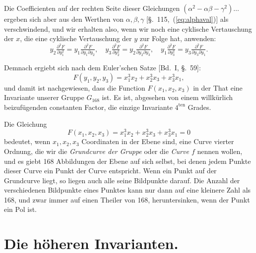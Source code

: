 \documentclass[12pt,a4paper]{article}
\begin{document}
Die Coefficienten auf der rechten Seite dieser Gleichungen $(\alpha^2 - \alpha\beta - \gamma^2) \ldots$ ergeben sich aber aus den Werthen von $\alpha, \beta, \gamma$ [\S.~115,~(\ref{eq:alphaval})] als verschwindend, und wir erhalten also, wenn wir noch eine cyklische Vertauschung der $x$, die eine cyklische Vertauschung der $y$ zur Folge hat, anwenden:
\[y_2 \tfrac{\partial^2 F}{\partial y_1^2} = y_1 \tfrac{\partial^2 F}{\partial y_1 \partial y_2}, \quad y_3 \tfrac{\partial^2 F}{\partial y_2^2} = y_2 \tfrac{\partial^2 F}{\partial y_2 \partial y_3}, \quad y_1 \tfrac{\partial^2 F}{\partial y_3^2} = y_3 \tfrac{\partial^2 F}{\partial y_3 \partial y_1}.\]

Demnach ergiebt sich nach dem Euler'schen Satze [Bd.~I, \S.~59]:
\[F(y_1, y_2, y_3) = x_1^3 x_2 + x_2^3 x_3 + x_3^3 x_1,\]
und damit ist nachgewiesen, dass die Function $F(x_1, x_2, x_3)$ in der That eine Invariante unserer Gruppe $G_{168}$ ist. Es ist, abgesehen von einem willk\"urlich beizuf\"ugenden constanten Factor, die einzige Invariante $4^{\text{ten}}$ Grades.

Die Gleichung
\begin{equation}
\label{eq:grundcurve} F(x_1, x_2, x_3) = x_1^3 x_2 + x_2^3 x_3 + x_3^3 x_1 = 0
\end{equation}
bedeutet, wenn $x_1, x_2, x_3$ Coordinaten in der Ebene sind, eine Curve vierter Ordnung, die wir die \textit{Grundcurve der Gruppe} oder die \textit{Curve $f$} nennen wollen, und es giebt 168 Abbildungen der Ebene auf sich selbst, bei denen jedem Punkte dieser Curve ein Punkt der Curve entspricht. Wenn ein Punkt auf der Grundcurve liegt, so liegen auch alle seine Bildpunkte darauf. Die Anzahl der verschiedenen Bildpunkte eines Punktes kann nur dann auf eine kleinere Zahl als 168, und zwar immer auf einen Theiler von 168, heruntersinken, wenn der Punkt ein Pol ist.

\newpage
\section{Die h\"oheren Invarianten.}
\label{sec:123}
\end{document}
